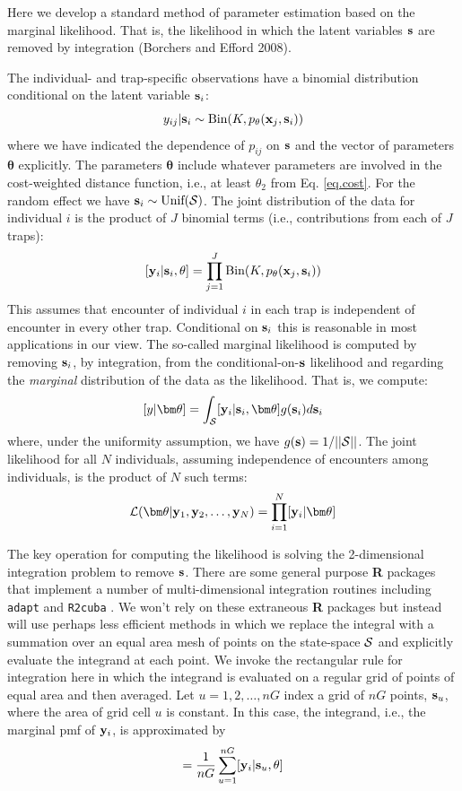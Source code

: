 Here we develop a standard method of parameter estimation based on
the marginal likelihood. That is, the likelihood in which the latent
variables ${\bf s}$ are removed by integration (Borchers and
Efford 2008). 

The individual- and trap-specific observations have a binomial
distribution conditional on the latent variable ${\bf s}_{i}$:
\begin{equation}
	y_{ij}| {\bf s}_{i} \sim \mbox{Bin}(K, p_{\theta}({\bf x}_{j},{\bf s}_{i}))
\label{mle.eq.cond-on-s}
\end{equation}
where we have indicated the dependence of $p_{ij}$ on ${\bf s}$ and
the vector of parameters ${\bm \theta}$ explicitly. The parameters
${\bm \theta}$ include whatever parameters are involved in the
cost-weighted distance function, i.e., at least $\theta_{2}$ from 
Eq. \ref{eq.cost}.
For the random effect we have ${\bf s}_{i} \sim  \mbox{Unif}({\cal
  S})$.
The joint distribution of the data for individual $i$ is the product
of $J$ binomial terms (i.e., contributions from each of $J$ traps):
\[
  [{\bf y}_{i} | {\bf s}_{i} , \theta] = 
  \prod_{j=1}^{J} \mbox{Bin}(K, p_{\theta}({\bf x}_{j},{\bf s}_{i}) )
\]
This assumes that encounter of individual $i$ in each
trap is independent of encounter in every other trap. Conditional on
${\bf s}_{i}$ this is reasonable in most applications in our view.
 The so-called marginal likelihood is computed by removing
${\bf s}_{i}$, by integration,  from the conditional-on-${\bf s}$
likelihood and regarding the {\it marginal} distribution of the data
as the likelihood. That
is, we compute:
\[
  [y|{\bm \theta}] = 
\int_{{\cal S}}  [ {\bf y}_{i} |{\bf s}_{i},{\bm \theta}] g({\bf s}_{i}) d{\bf s}_{i}
\]
where, under the uniformity assumption, we have
$g({\bf s}) = 1/||{\cal S}||$.
The joint likelihood for all $N$ individuals, assuming independence of
encounters among individuals, is the product of $N$ such terms:
\[
{\cal L}({\bm \theta} | {\bf y}_{1},{\bf y}_{2},\ldots, {\bf y}_{N}) = \prod_{i=1}^{N}
[{\bf y}_{i}|{\bm \theta}]
\]

The key operation for computing the likelihood is solving the
2-dimensional integration problem to remove ${\bf s}$. There are some
general purpose {\bf R} packages that implement a number of
multi-dimensional integration routines including \mbox{\tt adapt}
\citep{genz_etal:2007} and \mbox{\tt R2cuba} \citep{hahn_etal:2011}.
We won't rely on these extraneous {\bf R} packages but instead will
use perhaps less efficient methods in which we replace the integral
with a summation over an equal area mesh of points on the state-space
${\cal S}$ and explicitly evaluate the integrand at each point. We
invoke the rectangular rule for integration here in which the
integrand is evaluated on a regular grid of points of equal area and
then averaged.  Let $u=1,2,\ldots,nG$ index a grid of $nG$ points,
${\bf s}_{u}$, where the area of grid cell $u$ is constant.  In this
case, the integrand, i.e., the marginal pmf of ${\bf y}_{i}$, is
approximated by
\begin{equation}
         [{\bf y}_{i}|\theta] = \frac{1}{nG} \sum_{u=1}^{nG}  [ {\bf
            y}_{i} |{\bf s}_u, \theta]
\label{mle.eq.intlik}
\end{equation}

